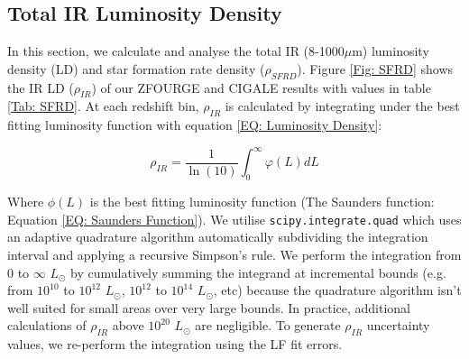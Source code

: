 \subsection{Total IR Luminosity Density} \label{Sec: IR Density}
In this section, we calculate and analyse the total IR (8-1000$\mu$m) luminosity density (LD) and star formation rate density ($\rho_{SFRD}$). Figure \ref{Fig: SFRD} shows the IR LD ($\rho_{IR}$) of our ZFOURGE and CIGALE results with values in table \ref{Tab: SFRD}. At each redshift bin, $\rho_{IR}$ is calculated by integrating under the best fitting luminosity function with equation \ref{EQ: Luminosity Density}:

\begin{equation} 
    \rho_{IR} = \frac{1}{\ln(10)} \int_{0}^{\infty} \varphi(L) dL 
    \label{EQ: Luminosity Density}
\end{equation}

Where $\phi(L)$ is the best fitting luminosity function (The Saunders function: Equation \ref{EQ: Saunders Function}). We utilise \texttt{scipy.integrate.quad} \citep{virtanen_scipy_2020} which uses an adaptive quadrature algorithm automatically subdividing the integration interval and applying a recursive Simpson’s rule. We perform the integration from $0$ to $\infty$ $L_{\odot}$ by cumulatively summing the integrand at incremental bounds (e.g. from $10^{10}$ to $10^{12}$ $L_{\odot}$, $10^{12}$ to $10^{14}$ $L_{\odot}$, etc) because the quadrature algorithm isn't well suited for small areas over very large bounds. In practice, additional calculations of $\rho_{IR}$ above $10^{20}$ $L_{\odot}$ are negligible. To generate $\rho_{IR}$ uncertainty values, we re-perform the integration using the LF fit errors.


